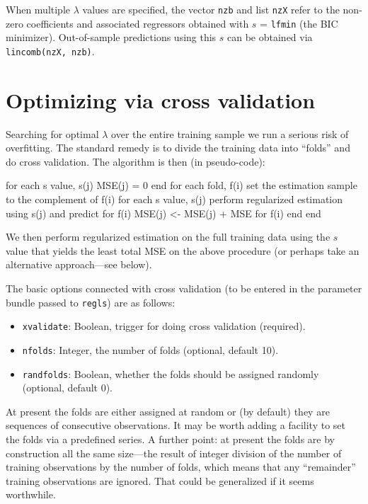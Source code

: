 \documentclass{article}
\begin{document}
When multiple $\lambda$ values are specified, the vector \texttt{nzb}
and list \texttt{nzX} refer to the non-zero coefficients and
associated regressors obtained with $s$ = \texttt{lfmin} (the BIC
minimizer). Out-of-sample predictions using this $s$ can be obtained
via \texttt{lincomb(nzX, nzb)}.

\section{Optimizing via cross validation}
\label{sec:xvalid}

Searching for optimal $\lambda$ over the entire training sample we run
a serious risk of overfitting. The standard remedy is to divide the
training data into ``folds'' and do cross validation. The algorithm is
then (in pseudo-code):
\begin{code}
for each s value, s(j)
  MSE(j) = 0
end
for each fold, f(i)
  set the estimation sample to the complement of f(i)
  for each s value, s(j)
    perform regularized estimation using s(j) and predict for f(i)
    MSE(j) <- MSE(j) + MSE for f(i)
  end
end
\end{code}
We then perform regularized estimation on the full training data using the
$s$ value that yields the least total MSE on the above procedure (or
perhaps take an alternative approach---see below).

The basic options connected with cross validation (to be entered in
the parameter bundle passed to \texttt{regls}) are as follows:
\begin{itemize}
\item \texttt{xvalidate}: Boolean, trigger for doing cross validation (required).
\item \texttt{nfolds}: Integer, the number of folds (optional, default
  10).
\item \texttt{randfolds}: Boolean, whether the folds should be
  assigned randomly (optional, default 0).
\end{itemize}

At present the folds are either assigned at random or (by default)
they are sequences of consecutive observations. It may be worth adding
a facility to set the folds via a predefined series. A further point:
at present the folds are by construction all the same size---the
result of integer division of the number of training observations by
the number of folds, which means that any ``remainder'' training
observations are ignored. That could be generalized if it seems
worthwhile.
\end{document}
